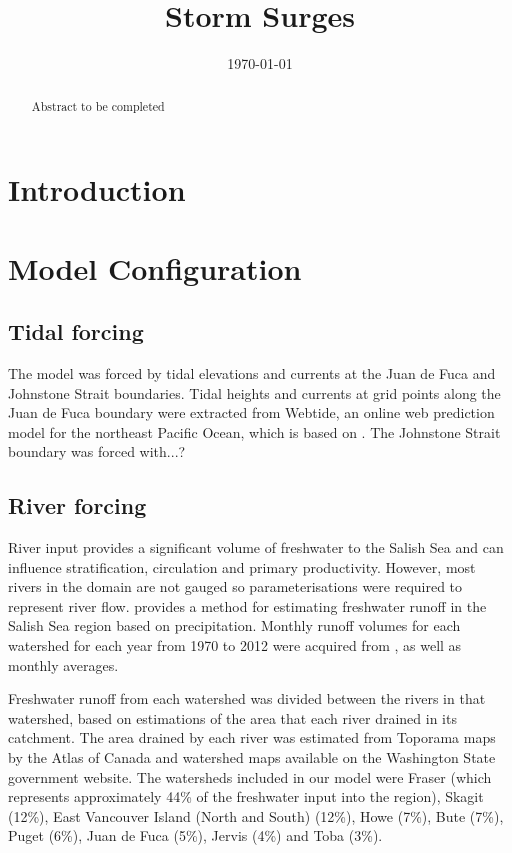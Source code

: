 \documentclass[pdftex,12pt]{article}
\title{Storm Surges}
\date{\today}
\begin{document}
\maketitle

\begin{abstract}
Abstract to be completed
\end{abstract}

\section{Introduction}\label{sec:intro}
\citep{masson2004modelling} %

\section{Model Configuration}
\subsection{Tidal forcing} %
The model was forced by tidal elevations and currents at the Juan de Fuca and Johnstone Strait boundaries. Tidal heights and currents at grid points along the Juan de Fuca boundary were extracted from Webtide, an online web prediction model for the northeast Pacific Ocean, which is based on \citep{foreman00webtide}. The Johnstone Strait boundary was forced with...?

\subsection{River forcing} %
River input provides a significant volume of freshwater to the Salish Sea and can influence stratification, circulation and primary productivity. However, most rivers in the domain are not gauged so parameterisations were required to represent river flow. \citep{morrison2011rivers} provides a method for estimating freshwater runoff in the Salish Sea region based on precipitation. Monthly runoff volumes for each watershed for each year from 1970 to 2012 were acquired from \citep{morrison2011rivers}, as well as monthly averages. 

Freshwater runoff from each watershed was divided between the rivers in that watershed, based on estimations of the area that each river drained in its catchment. The area drained by each river was estimated from Toporama maps by the Atlas of Canada and watershed maps available on the Washington State government website. The watersheds included in our model were Fraser (which represents approximately 44\% of the freshwater input into the region), Skagit (12\%), East Vancouver Island (North and South) (12\%), Howe (7\%), Bute (7\%), Puget (6\%), Juan de Fuca (5\%), Jervis (4\%) and Toba (3\%). 
\end{document}
